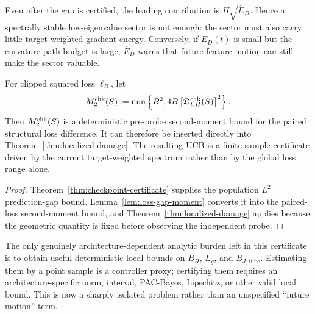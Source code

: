 \begin{remark}
Even after the gap is certified, the leading contribution is $H\sqrt{\overline E_D}$. Hence a spectrally stable low-eigenvalue sector is not enough: the sector must also carry little target-weighted gradient energy. Conversely, if $E_D(t)$ is small but the curvature path budget is large, $\overline E_D$ warns that future feature motion can still make the sector valuable.
\end{remark}

\begin{corollary}\label{cor:checkpoint-observability}
For clipped squared loss $\ell_B$, let
\[
M_{2}^{\rm chk}(S)
:=
\min\left\{
B^2,
4B\left[\mathfrak D^{\rm chk}_{t,H}(S)\right]^2
\right\}.
\]
Then $M_2^{\rm chk}(S)$ is a deterministic pre-probe second-moment bound for the paired structural loss difference. It can therefore be inserted directly into Theorem~\ref{thm:localized-damage}. The resulting UCB is a finite-sample certificate driven by the current target-weighted spectrum rather than by the global loss range alone.
\end{corollary}

\begin{proof}
Theorem~\ref{thm:checkpoint-certificate} supplies the population $L^2$ prediction-gap bound. Lemma~\ref{lem:loss-gap-moment} converts it into the paired-loss second-moment bound, and Theorem~\ref{thm:localized-damage} applies because the geometric quantity is fixed before observing the independent probe.
\end{proof}

\begin{remark}
The only genuinely architecture-dependent analytic burden left in this certificate is to obtain useful deterministic local bounds on $B_H$, $L_g$, and $B_{J,\mathrm{tube}}$. Estimating them by a point sample is a controller proxy; certifying them requires an architecture-specific norm, interval, PAC-Bayes, Lipschitz, or other valid local bound. This is now a sharply isolated problem rather than an unspecified ``future motion'' term.
\end{remark}
